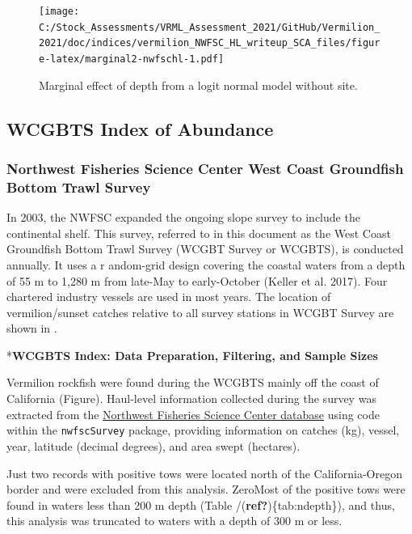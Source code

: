 \documentclass[
  english,
  a4paper,
]{article}
\begin{document}
\begin{figure}
\centering
\texttt{[image: C:/Stock\_Assessments/VRML\_Assessment\_2021/GitHub/Vermilion\_2021/doc/indices/vermilion\_NWFSC\_HL\_writeup\_SCA\_files/figure-latex/marginal2-nwfschl-1.pdf]}
\caption{\label{fig:marginal2-nwfschl}Marginal effect of depth from a logit normal model without site.}
\end{figure}

\clearpage

\hypertarget{wcgbts-index}{%
\subsection{WCGBTS Index of Abundance}\label{wcgbts-index}}

\hypertarget{northwest-fisheries-science-center-west-coast-groundfish-bottom-trawl-survey}{%
\subsubsection{Northwest Fisheries Science Center West Coast Groundfish Bottom Trawl Survey}\label{northwest-fisheries-science-center-west-coast-groundfish-bottom-trawl-survey}}

In 2003, the NWFSC expanded the ongoing slope survey to include the continental
shelf. This survey, referred to in this document as the West Coast Groundfish
Bottom Trawl Survey (WCGBT Survey or WCGBTS), is conducted annually. It uses a r
andom-grid design covering the coastal waters from a depth of 55 m to 1,280 m
from late-May to early-October (Keller et al. 2017). Four chartered industry vessels
are used in most years. The location of vermilion/sunset catches relative to all
survey stations in WCGBT Survey are shown in .

*\textbf{WCGBTS Index: Data Preparation, Filtering, and Sample Sizes}

Vermilion rockfish were found during the WCGBTS mainly off the coast of
California (Figure). Haul-level information collected during the
survey was extracted from the
\href{https://www.webapps.nwfsc.noaa.gov/data}{Northwest Fisheries Science Center database}
using code within the \texttt{nwfscSurvey} package, providing information on
catches (kg),
vessel,
year,
latitude (decimal degrees), and
area swept (hectares).

Just
two
records with positive tows were located north of the California-Oregon border
and were excluded from this analysis.
ZeroMost of the positive tows were found in waters less than 200 m depth
(Table /(\textbf{ref?})\{tab:ndepth\}), and thus,
this analysis was truncated to waters with a depth of 300 m or less.
\end{document}
